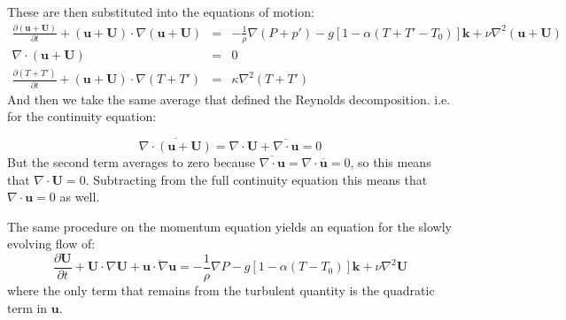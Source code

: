 \documentclass[11pt]{article}
\begin{document}
These are then substituted into the equations of motion:
\begin{eqnarray*}
     \frac{\partial (\mathbf{u}+\mathbf{U})}{\partial t} +
(\mathbf{u}+\mathbf{U})\cdot \nabla (\mathbf{u}+\mathbf{U}) & = &
-\frac{1}{\rho} \nabla (P+p') - g \left[  1 - \alpha(T+T'-T_0)\right]\mathbf{k}
+ \nu \nabla^2(\mathbf{u}+\mathbf{U})\\
     \nabla\cdot\mathbf{(\mathbf{u}+\mathbf{U})} & = & 0\\
     \frac{\partial (T+T')}{\partial t} +
\mathbf{(\mathbf{u}+\mathbf{U})}\cdot\nabla (T+T') & = & \kappa \nabla^2
(T+T')
 \end{eqnarray*}
And then we take the same average that defined the Reynolds decomposition. 
i.e. for the continuity equation:

\begin{equation}
    \overline{\nabla\cdot\mathbf{(\mathbf{u}+\mathbf{U})}} = \nabla\cdot
\mathbf{U} + \overline{\nabla\cdot \mathbf{u}}  = 0
\end{equation}
But the second term averages to zero because $\overline{\nabla\cdot \mathbf{u}}
= \nabla\cdot \overline{\mathbf{u}} = 0$, so this means that
$\nabla\cdot\mathbf{U} = 0$.  Subtracting from the full continuity equation
this means that $\nabla\cdot \mathbf{u} = 0$ as well.  

The same procedure on the momentum equation yields an equation for the slowly
evolving flow of:
\begin{equation}
    \frac{\partial \mathbf{U}}{\partial t} + \mathbf{U}\cdot \nabla \mathbf{U}
+ \overline{\mathbf{u} \cdot \nabla \mathbf{u}} = -\frac{1}{\rho} \nabla P - g
\left[ 1 - \alpha \left( T-T_0 \right) \right] \mathbf{k} + \nu\nabla^2
\mathbf{U}
\end{equation}
where the only term that remains from the turbulent quantity is the quadratic
term in $\mathbf{u}$.  
\end{document}

